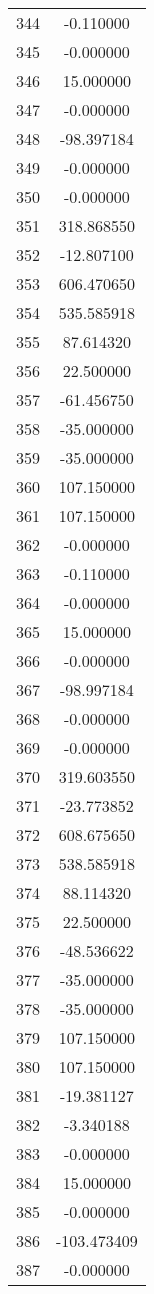 \documentclass[12pt]{article}
\begin{document}
\begin{longtable}{@{}cc@{}}
344 & -0.110000 \\
345 & -0.000000 \\
346 & 15.000000 \\
347 & -0.000000 \\
348 & -98.397184 \\
349 & -0.000000 \\
350 & -0.000000 \\
351 & 318.868550 \\
352 & -12.807100 \\
353 & 606.470650 \\
354 & 535.585918 \\
355 & 87.614320 \\
356 & 22.500000 \\
357 & -61.456750 \\
358 & -35.000000 \\
359 & -35.000000 \\
360 & 107.150000 \\
361 & 107.150000 \\
362 & -0.000000 \\
363 & -0.110000 \\
364 & -0.000000 \\
365 & 15.000000 \\
366 & -0.000000 \\
367 & -98.997184 \\
368 & -0.000000 \\
369 & -0.000000 \\
370 & 319.603550 \\
371 & -23.773852 \\
372 & 608.675650 \\
373 & 538.585918 \\
374 & 88.114320 \\
375 & 22.500000 \\
376 & -48.536622 \\
377 & -35.000000 \\
378 & -35.000000 \\
379 & 107.150000 \\
380 & 107.150000 \\
381 & -19.381127 \\
382 & -3.340188 \\
383 & -0.000000 \\
384 & 15.000000 \\
385 & -0.000000 \\
386 & -103.473409 \\
387 & -0.000000 \\

\end{longtable}
\end{document}
